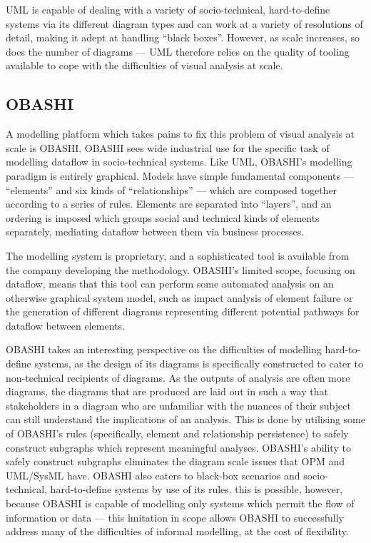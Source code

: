 \documentclass[draft]{article}
\begin{document}
UML is capable of dealing with a variety of socio-technical, hard-to-define
systems via its different diagram types and can work at a variety of resolutions
of detail, making it adept at handling ``black boxes''. However, as scale
increases, so does the number of diagrams --- UML therefore relies on the
quality of tooling available to cope with the difficulties of visual analysis at
scale.\par

\subsection{OBASHI}
\label{subsec:obashi}
A modelling platform which takes pains to fix this problem of visual analysis at
scale is OBASHI\cite{obashi_methodology}. OBASHI sees wide industrial use for
the specific task of modelling dataflow in socio-technical systems. Like UML,
OBASHI's modelling paradigm is entirely graphical. Models have simple
fundamental components --- ``elements'' and six kinds of ``relationships'' ---
which are composed together according to a series of rules. Elements are
separated into ``layers'', and an ordering is imposed which groups social and
technical kinds of elements separately, mediating dataflow between them via
business processes.\par

The modelling system is proprietary, and a sophisticated tool is available from
the company developing the methodology. OBASHI's limited scope, focusing on
dataflow, means that this tool can perform some automated analysis on an
otherwise graphical system model, such as impact analysis of element failure or
the generation of different diagrams representing different potential pathways
for dataflow between elements.\par

OBASHI takes an interesting perspective on the difficulties of modelling
hard-to-define systems, as the design of its diagrams is specifically
constructed to cater to non-technical recipients of diagrams. As the outputs of
analysis are often more diagrams, the diagrams that are produced are laid out in
such a way that stakeholders in a diagram who are unfamiliar with the nuances of
their subject can still understand the implications of an analysis. This is done
by utilising some of OBASHI's rules (specifically, element and relationship
persistence) to safely construct subgraphs which represent meaningful analyses.
OBASHI's ability to safely construct subgraphs eliminates the diagram scale
issues that OPM and UML/SysML have. OBASHI also caters to black-box scenarios
and socio-technical, hard-to-define systems by use of its rules. this is
possible, however, because OBASHI is capable of modelling only systems which
permit the flow of information or data --- this lmitation in scope allows OBASHI
to successfully address many of the difficulties of informal modelling, at the
cost of flexibility.\par
\end{document}
